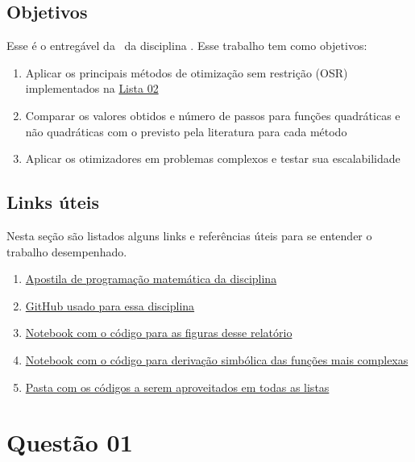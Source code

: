 \documentclass[10pt, a4paper]{article}
\begin{document}
\subsection{Objetivos}

Esse é o entregável da \TITLE \ da disciplina \DISCIPLINE. Esse trabalho tem como objetivos:

\begin{enumerate}
  \item Aplicar os principais métodos de otimização sem restrição (OSR) implementados na \href{https://github.com/prj-phcp/MEC2403_Activities/blob/master/Lista2/Lista2.pdf}{Lista 02}
  \item Comparar os valores obtidos e número de passos para funções quadráticas e não quadráticas com o previsto pela literatura para cada método
  \item Aplicar os otimizadores em problemas complexos e testar sua escalabilidade
\end{enumerate}

\subsection{Links úteis}\label{links}

Nesta seção são listados alguns links e referências úteis para se entender o trabalho desempenhado.

\begin{enumerate}
  \item \href{https://web.tecgraf.puc-rio.br/~ivan/MEC2403/ProgMatematica_VazPereiraMenezes-Ago2012.pdf}{Apostila de programação matemática da disciplina}
  \item \href{https://github.com/prj-phcp/MEC2403_Activities}{GitHub usado para essa disciplina}
  \item \href{https://github.com/prj-phcp/MEC2403_Activities/blob/master/Trabalho1/Trabalho1.ipynb}{Notebook com o código para as figuras desse relatório}
  \item \href{https://github.com/prj-phcp/MEC2403_Activities/blob/master/Trabalho1/Derivadas.ipynb}{Notebook com o código para derivação simbólica das funções mais complexas}
  \item \href{https://github.com/prj-phcp/MEC2403_Activities/blob/master/packages}{Pasta com os códigos a serem aproveitados em todas as listas}
\end{enumerate}

\section{Questão 01}\label{sec:q01}
\end{document}
